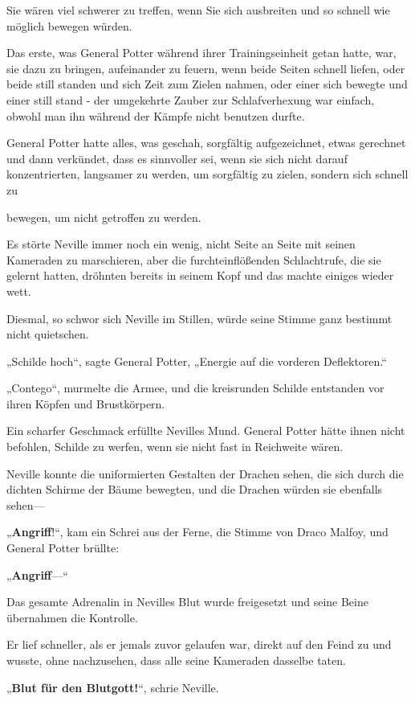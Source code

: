 {Sie wären viel schwerer zu treffen, wenn Sie sich ausbreiten und so schnell wie möglich bewegen würden.

Das erste, was General Potter während ihrer Trainingseinheit getan hatte, war, sie dazu zu bringen, aufeinander zu feuern, wenn beide Seiten schnell liefen, oder beide still standen und sich Zeit zum Zielen nahmen, oder einer sich bewegte und einer still stand - der umgekehrte Zauber zur Schlafverhexung war einfach, obwohl man ihn während der Kämpfe nicht benutzen durfte.

General Potter hatte alles, was geschah, sorgfältig aufgezeichnet, etwas gerechnet und dann verkündet, dass es sinnvoller sei, wenn sie sich nicht darauf konzentrierten, langsamer zu werden, um sorgfältig zu zielen, sondern sich schnell zu

bewegen, um nicht getroffen zu werden.

Es störte Neville immer noch ein wenig, nicht Seite an Seite mit seinen Kameraden zu marschieren, aber die furchteinflößenden Schlachtrufe, die sie gelernt hatten, dröhnten bereits in seinem Kopf und das machte einiges wieder wett.

Diesmal, so schwor sich Neville im Stillen, würde seine Stimme ganz bestimmt nicht quietschen.

„Schilde hoch“, sagte General Potter, „Energie auf die vorderen Deflektoren.“

„Contego“, murmelte die Armee, und die kreisrunden Schilde entstanden vor ihren Köpfen und Brustkörpern.

Ein scharfer Geschmack erfüllte Nevilles Mund. General Potter hätte ihnen nicht befohlen, Schilde zu werfen, wenn sie nicht fast in Reichweite wären.

Neville konnte die uniformierten Gestalten der Drachen sehen, die sich durch die dichten Schirme der Bäume bewegten, und die Drachen würden sie ebenfalls sehen—

„\textbf{Angriff}!“, kam ein Schrei aus der Ferne, die Stimme von Draco Malfoy, und General Potter brüllte:

„\textbf{Angriff}—“

Das gesamte Adrenalin in Nevilles Blut wurde freigesetzt und seine Beine übernahmen die Kontrolle.

Er lief schneller, als er jemals zuvor gelaufen war, direkt auf den Feind zu und wusste, ohne nachzusehen, dass alle seine Kameraden dasselbe taten.

„\textbf{Blut für den Blutgott!}“, schrie Neville.

}
